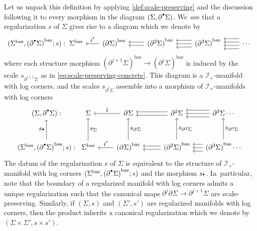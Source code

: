 \documentclass[10pt]{amsart}
\let\oldbullet\bullet
\renewcommand{\bullet}{{\raisebox{1pt}{$\scriptscriptstyle\oldbullet$}}}
\let\tst\textstyle
\theoremstyle{definition}
\theoremstyle{remark}
\newcommand{\Sig}{\Sigma}
\newcommand{\bas}[1]{{#1}^{\mathrm{bas}}}
\newcommand{\Sigbas}{\bas{\Sig}}
\newcommand{\bdSig}[1][]{\partial^{#1}\Sigma}
\newcommand{\ascat}{\mathscr{I}_+}
\begin{document}
Let us unpack this definition by applying \autoref{def:scale-preserving} and the discussion following it to every morphism in the diagram $(\Sig,\bdSig[\bullet])$. We~see that a regularization $s$ of $\Sig$ gives rise to a diagram which we denote by
\[
\begin{tikzcd}[column sep = .4cm, row sep = 1cm,baseline=-0.9cm]
(\Sigbas,\bas{(\bdSig[\bullet])};s): &[-.5cm] \Sigbas &[.3cm] \bas{(\bdSig)}\ar[l,"\tst i'"'] &[.4cm] \bas{(\bdSig[2])} \ar[l,shift left] \ar[l,shift right] &[.4cm] \bas{(\bdSig[3])} \ar[l,shift left = 2]\ar[l,shift left = 0]\ar[l,shift left = -2] &[.4cm] \cdots \ar[l,shift left = 3]\ar[l,shift left = 1]\ar[l,shift left = -1]\ar[l,shift left = -3]
\end{tikzcd}
\]
where each structure morphism $\bas{(\bdSig[j+1])}\to \bas{(\bdSig[j])}$ is induced by the scale $s_{\bdSig[j+1]}$ as in \eqref{eq:scale-preserving-concrete}. This diagram is a $\ascat$-manifold with log corners, and the scales $s_{\bdSig[j]}$ assemble into a morphism of $\ascat$-manifolds with log corners
\begin{equation}
\begin{tikzcd}[column sep = .5cm, row sep = 1cm]
(\Sig,\bdSig[\bullet]): &[-.5cm] \Sig &[.3cm] \bdSig \ar[l,"\tst i"'] &[.4cm] \bdSig[2] \ar[l,shift left] \ar[l,shift right] & \bdSig[3] \ar[l,shift left = 2]\ar[l,shift left = 0]\ar[l,shift left = -2] \cdots \\
(\Sigbas,\bas{(\bdSig[\bullet])};s): \ar[u,"\tst s_\bullet"]& \Sigbas \ar[u,"\tst s_\Sig"'] & \bas{(\bdSig)} \ar[l,"\tst i'"']\ar[u,"\tst s_{\bdSig}"'] & \bas{(\bdSig[2])}\ar[l,shift left] \ar[l,shift right]\ar[u,"\tst s_{\bdSig[2]}"'] & \bas{(\bdSig[3])} \ar[l,shift left = 2]\ar[l,shift left = 0]\ar[l,shift left = -2]\ar[u,"\tst s_{\bdSig[3]}"'] \cdots
\end{tikzcd}
\label{eq:regularization-diagram}
\end{equation}
The datum of the regularization $s$ of $\Sig$ is equivalent to the structure of $\ascat$-manifold with log corners $(\Sigbas,\bas{(\bdSig[\bullet])};s)$ and the morphism $s_\bullet$. In~particular, note that the boundary of a regularized manifold with log corners admits a unique regularization such that the canonical maps $\partial^j\bdSig \to \bdSig[j+1]$ are scale-preserving. Similarly, if $(\Sig,s)$ and $(\Sig',s')$ are regularized manifolds with log corners, then the product inherits a canonical regularization which we denote by $(\Sig\times\Sig',s\times s')$.
\end{document}

